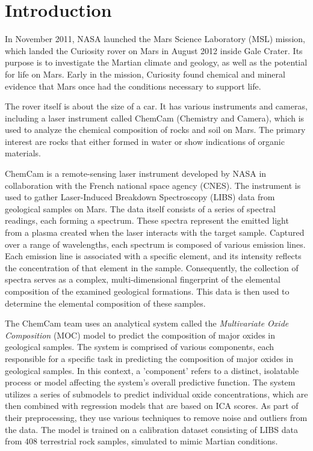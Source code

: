 \section{Introduction}\label{sec:introduction}
In November 2011, NASA launched the Mars Science Laboratory (MSL) mission, which landed the Curiosity rover on Mars in August 2012 inside Gale Crater. Its purpose is to investigate the Martian climate and geology, as well as the potential for life on Mars.
Early in the mission, Curiosity found chemical and mineral evidence that Mars once had the conditions necessary to support life.\cite{chemcamNasaWebsite}

The rover itself is about the size of a car.
It has various instruments and cameras, including a laser instrument called ChemCam (Chemistry and Camera), which is used to analyze the chemical composition of rocks and soil on Mars.
The primary interest are rocks that either formed in water or show indications of organic materials.\cite{chemcamNasaWebsite}

ChemCam is a remote-sensing laser instrument developed by NASA in collaboration with the French national space agency (CNES).
The instrument is used to gather Laser-Induced Breakdown Spectroscopy (LIBS) data from geological samples on Mars. The data itself consists of a series of spectral readings, each forming a spectrum. These spectra represent the emitted light from a plasma created when the laser interacts with the target sample. Captured over a range of wavelengths, each spectrum is composed of various emission lines. Each emission line is associated with a specific element, and its intensity reflects the concentration of that element in the sample. Consequently, the collection of spectra serves as a complex, multi-dimensional fingerprint of the elemental composition of the examined geological formations.
This data is then used to determine the elemental composition of these samples.\cite{cleggRecalibrationMarsScience2017}

The ChemCam team uses an analytical system called the \textit{Multivariate Oxide Composition} (MOC) model to predict the composition of major oxides in geological samples. 
The system is comprised of various components, each responsible for a specific task in predicting the composition of major oxides in geological samples.
In this context, a 'component' refers to a distinct, isolatable process or model affecting the system's overall predictive function.
The system utilizes a series of submodels to predict individual oxide concentrations, which are then combined with regression models that are based on ICA scores.
As part of their preprocessing, they use various techniques to remove noise and outliers from the data.\cite{cleggRecalibrationMarsScience2017}
The model is trained on a calibration dataset consisting of LIBS data from 408 terrestrial rock samples, simulated to mimic Martian conditions\cite{cleggRecalibrationMarsScience2017}.

